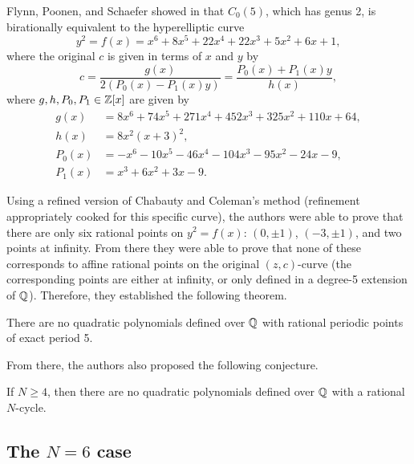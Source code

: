 Flynn, Poonen, and Schaefer showed in \cite{MR1480542} that $C_0(5)$,
which has genus 2, is birationally equivalent to the hyperelliptic
curve
\begin{equation}
  \label{eq:c0(5)}
  y^2 = f(x) = x^6 + 8x^5 + 22x^4 + 22x^3 + 5x^2 + 6x + 1,
\end{equation}
where the original $c$ is given in terms of $x$ and $y$ by
\begin{equation}
  \label{eq:c-in-xy}
  c = \frac{g(x)}{2(P_0(x) - P_1(x) y)}
  = \frac{P_0(x) + P_1(x) y}{h(x)},
\end{equation}
where $g, h, P_0, P_1 \in \mathbb{Z}[x]$ are given by
\begin{subequations}
  \label{eq:poly-defs}
  \begin{align}
    g(x) & = 8x^6 + 74x^5 + 271x^4 + 452x^3 + 325x^2 + 110x + 64,\\
    h(x) & = 8x^2(x+3)^2,\\
    P_0(x) & = - x^6 - 10x^5 - 46x^4 - 104x^3 - 95x^2 - 24x - 9,\\
    P_1(x) & = x^3 + 6x^2 + 3x - 9.
  \end{align}
\end{subequations}

Using a refined version of Chabauty and Coleman's method (refinement
appropriately cooked for this specific curve), the authors were able
to prove that there are only six rational points on $y^2 = f(x)$: $(0,
\pm 1)$, $(-3, \pm 1)$, and two points at infinity. From there they
were able to prove that none of these corresponds to affine rational
points on the original $(z, c)$-curve (the corresponding points are
either at infinity, or only defined in a degree-5 extension of $\mathbb{Q}$).
Therefore, they established the following theorem.

\begin{theorem}
  There are no quadratic polynomials defined over $\mathbb{Q}$ with rational
  periodic points of exact period 5.
\end{theorem}

From there, the authors also proposed the following conjecture.

\begin{conjecture}
  If $N \ge 4$, then there are no quadratic polynomials defined over
  $\mathbb{Q}$ with a rational $N$-cycle.
\end{conjecture}

\subsection{The $N = 6$ case}
\label{subsec:model-6}

